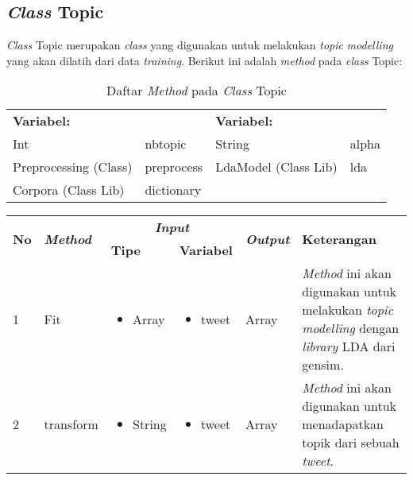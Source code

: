 \subsection{\textit{Class} Topic}
\textit{Class }Topic merupakan \textit{class} yang digunakan untuk melakukan \textit{topic} \textit{modelling} yang akan dilatih dari data \textit{training}. Berikut ini adalah \textit{method }pada \textit{class }Topic:
\begin{table}[H]
	\caption{Daftar \textit{Method} pada \textit{Class} Topic}
	\centering
	\small
	\begin{adjustbox}{width=1\textwidth}	
	\begin{tabular}{|p{4cm} p{2.1cm} p{4cm} p{2.1cm}|}
		\hline
		\multicolumn{2}{|l}{\textbf{Variabel:}}&\multicolumn{2}{l|}{\textbf{Variabel:}}\\
		Int&nbtopic&String&alpha\\
		Preprocessing (Class)&preprocess&LdaModel (Class Lib)&lda \\
		Corpora (Class Lib)&dictionary& & \\
		\hline
	\end{tabular}
	\end{adjustbox}
\end{table}
\begin{table}[H]
	\centering
	\small
	\begin{adjustbox}{width=1\textwidth}	
	\begin{tabular}{|p{0.4cm}|p{3.2cm}|p{1.4cm}|p{1.7cm}|p{1.20cm}|p{3.35cm}|}
		\hline
		\multirow{2}{*}{\textbf{No}} & \multirow{2}{*}{\textit{\textbf{Method}}} & \multicolumn{2}{c|}{\textit{\textbf{Input}}} & \multirow{2}{*}{\textit{\textbf{Output}}} & 
		\multirow{2}{*}{\textbf{Keterangan}}\\
		\cline{3-4}
		& & \textbf{Tipe} & \textbf{Variabel} & & \\
		\hline
		1 & Fit & \begin{itemize}[leftmargin=*,label={-}]
			\item Array\end{itemize}
		& \begin{itemize}[leftmargin=*,label={-}]
			\vspace{-0.5cm}
			\item tweet\end{itemize}
		& Array & \textit{Method} ini akan digunakan untuk melakukan \textit{topic} \textit{modelling} dengan \textit{library} LDA dari gensim. 
		\\
		\hline
		2 & transform & \begin{itemize}[leftmargin=*,label={-}]
			\vspace{-0.5cm}
			\item String\end{itemize}
		& \begin{itemize}[leftmargin=*,label={-}]
			\vspace{-0.5cm}
			\item tweet\end{itemize}
		& Array & \textit{Method} ini akan digunakan untuk menadapatkan topik dari sebuah \textit{tweet}. \\
		\hline
	\end{tabular}
	\end{adjustbox}
\end{table}
